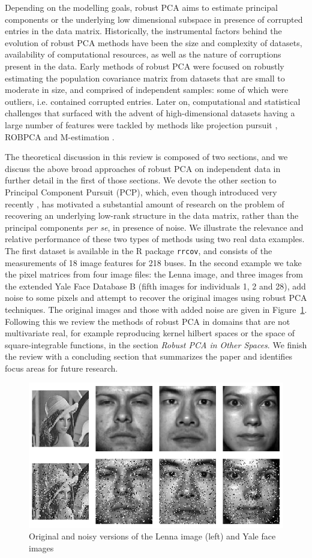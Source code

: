 Depending on the modelling goals, robust PCA aims to estimate principal components or the underlying low dimensional subspace in presence of corrupted entries in the data matrix. Historically, the instrumental factors behind the evolution of robust PCA methods have been the size and complexity of datasets, availability of computational resources, as well as the nature of corruptions present in the data. Early methods of robust PCA were focused on robustly estimating the population covariance matrix from datasets that are small to moderate in size, and comprised of independent samples: some of which were outliers, i.e. contained corrupted entries. Later on, computational and statistical challenges that surfaced with the advent of high-dimensional datasets having a large number of features were tackled by methods like projection pursuit \citep{LiChen85}, ROBPCA \citep{hubert05} and M-estimation \citep{LocantoreEtal99,Majumdar15}.

The theoretical discussion in this review is composed of two sections, and we discuss the above broad approaches of robust PCA on independent data in further detail in the first of those sections. We devote the other section to Principal Component Pursuit (PCP), which, even though introduced very recently \citep{CandesEtal09}, has motivated a substantial amount of research on the problem of recovering an underlying low-rank structure in the data matrix, rather than the principal components \textit{per se}, in presence of noise. We illustrate the relevance and relative performance of these two types of methods using two real data examples. The first dataset is available in the R package \texttt{rrcov}, and consists of the measurements of 18 image features for 218 buses. In the second example we take the pixel matrices from four image files: the Lenna image, and three images from the extended Yale Face Database B \citep{GeBeKr01,KCLee05} (fifth images for individuals 1, 2 and 28), add noise to some pixels and attempt to recover the original images using robust PCA techniques. The original images and those with added noise are given in Figure~\ref{fig:allimages}. Following this we review the methods of robust PCA in domains that are not multivariate real, for example reproducing kernel hilbert spaces or the space of square-integrable functions, in the section {\it Robust PCA in Other Spaces}. We finish the review with a concluding section that summarizes the paper and identifies focus areas for future research.

\begin{figure}[t]
\centering
\includegraphics[width=.7\textwidth]{all_images}
\caption{Original and noisy versions of the Lenna image (left) and Yale face images}
\label{fig:allimages}
\end{figure}
